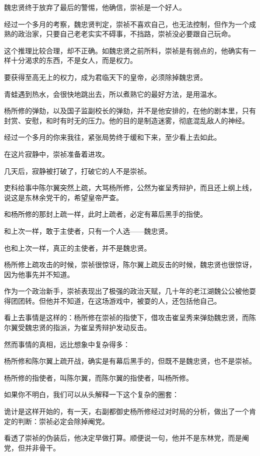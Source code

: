 \begin{multicols}{\theparacolNo}
魏忠贤终于放弃了最后的警惕，他确信，崇祯是一个好人。

经过一个多月的考察，魏忠贤判定，崇祯不喜欢自己，也无法控制，但作为一个成熟的政治家，只要自己老老实实不碍事，不挡路，崇祯没必要跟自己玩命。

这个推理比较合理，却不正确。如魏忠贤之前所料，崇祯是有弱点的，他确实有一样十分渴求的东西，不是女人，而是权力。

要获得至高无上的权力，成为君临天下的皇帝，必须除掉魏忠贤。

青蛙遇到热水，会很快地跳出去，所以煮熟它的最好方法，是用温水。

杨所修的弹劾，以及国子监副校长的弹劾，并不是他安排的，在他的剧本里，只有封赏、安慰，和时有时无的压力。他的目的是制造迷雾，彻底混乱敌人的神经。

经过一个多月的你来我往，紧张局势终于缓和下来，至少看上去如此。

在这片寂静中，崇祯准备着进攻。

几天后，寂静被打破了，打破它的人不是崇祯。

吏科给事中陈尔翼突然上疏，大骂杨所修，公然为崔呈秀辩护，而且还上纲上线，说这是东林余党干的，希望皇帝严查。

和杨所修的那封上疏一样，此时上疏者，必定有幕后黑手的指使。

和上次一样，敢于主使者，只有一个人选——魏忠贤。

也和上次一样，真正的主使者，并不是魏忠贤。

杨所修上疏攻击的时候，崇祯很惊讶，陈尔翼上疏反击的时候，魏忠贤也很惊讶，因为他事先并不知道。

作为一个政治新手，崇祯表现出了极强的政治天赋，几十年的老江湖魏公公被他耍得团团转。但他并不知道，在这场游戏中，被耍的人，还包括他自己。

看上去事情是这样的：杨所修在崇祯的指使下，借攻击崔呈秀来弹劾魏忠贤，而陈尔翼受魏忠贤的指派，为崔呈秀辩护发动反击。

然而事情的真相，远比想象中复杂得多：

杨所修和陈尔翼上疏开战，确实是有幕后黑手的，但既不是魏忠贤，也不是崇祯。

杨所修的指使者，叫陈尔翼，而陈尔翼的指使者，叫杨所修。

如果你不明白，我们可以从头解释一下这个复杂的圈套：

诡计是这样开始的，有一天，右副都御史杨所修经过对时局的分析，做出了一个肯定的判断：崇祯必定会除掉阉党。

看透了崇祯的伪装后，他决定早做打算。顺便说一句，他并不是东林党，而是阉党，但并非骨干。


\end{multicols}
